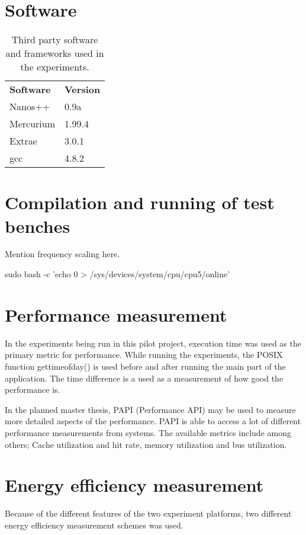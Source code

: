 
\section{Software}
\begin{table}[H]
  \begin{tabular}{ll}
    \textbf{Software} & \textbf{Version}  \\
    Nanos++           & 0.9a              \\
    Mercurium         & 1.99.4            \\
    Extrae            & 3.0.1             \\
    gcc               & 4.8.2             
  \end{tabular}
  \caption{Third party software and frameworks used in the experiments.\label{overflow}}
\end{table}


\section{Compilation and running of test benches}
Mention frequency scaling here.

sudo bash -c 'echo 0 > /sys/devices/system/cpu/cpu5/online'

\section{Performance measurement}
In the experiments being run in this pilot project, execution time was used as the primary metric for performance.
While running the experiments, the POSIX function gettimeofday() is used before and after running the main part of the application.
The time difference is a used as a measurement of how good the performance is.

In the planned master thesis, PAPI (Performance API) may be used to measure more detailed aspects of the performance.
PAPI is able to access a lot of different performance measurements from systems.
The available metrics include among others; Cache utilization and hit rate, memory utilization and bus utilization.

\section{Energy efficiency measurement}
Because of the different features of the two experiment platforms, two different energy efficiency measurement schemes was used.

